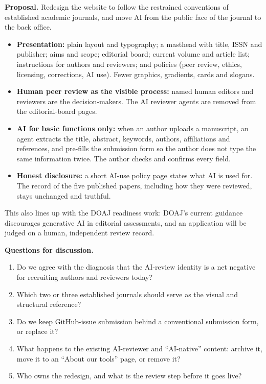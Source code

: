\documentclass[11pt]{article}
\begin{document}
\begin{takeaway}
\textbf{Proposal.} Redesign the website to follow the restrained conventions of established academic journals, and move AI from the public face of the journal to the back office.
\begin{itemize}
  \item \textbf{Presentation:} plain layout and typography; a masthead with title, ISSN and publisher; aims and scope; editorial board; current volume and article list; instructions for authors and reviewers; and policies (peer review, ethics, licensing, corrections, AI use). Fewer graphics, gradients, cards and slogans.
  \item \textbf{Human peer review as the visible process:} named human editors and reviewers are the decision-makers. The AI reviewer agents are removed from the editorial-board pages.
  \item \textbf{AI for basic functions only:} when an author uploads a manuscript, an agent extracts the title, abstract, keywords, authors, affiliations and references, and pre-fills the submission form so the author does not type the same information twice. The author checks and confirms every field.
  \item \textbf{Honest disclosure:} a short AI-use policy page states what AI is used for. The record of the five published papers, including how they were reviewed, stays unchanged and truthful.
\end{itemize}
\end{takeaway}

This also lines up with the DOAJ readiness work: DOAJ's current guidance discourages generative AI in editorial assessments, and an application will be judged on a human, independent review record.

\textbf{Questions for discussion.}
\begin{enumerate}
  \item Do we agree with the diagnosis that the AI-review identity is a net negative for recruiting authors and reviewers today?
  \item Which two or three established journals should serve as the visual and structural reference?
  \item Do we keep GitHub-issue submission behind a conventional submission form, or replace it?
  \item What happens to the existing AI-reviewer and ``AI-native'' content: archive it, move it to an ``About our tools'' page, or remove it?
  \item Who owns the redesign, and what is the review step before it goes live?
\end{enumerate}
\end{document}
